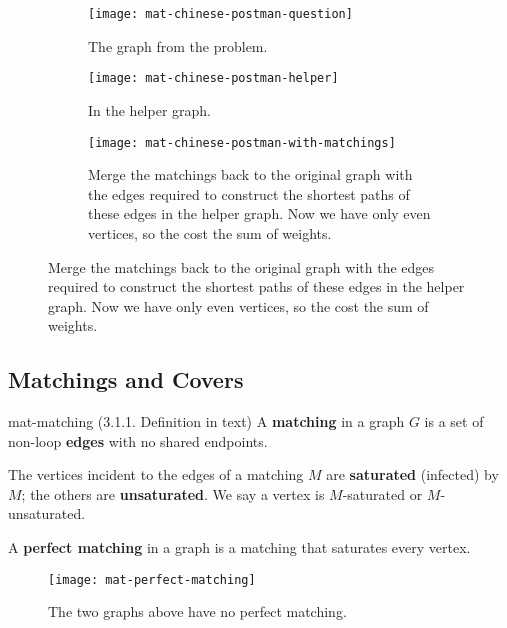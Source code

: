 \documentclass[../src/handouts/main.tex]{subfiles}
\begin{document}
\begin{figure}[htbp]
  \centering
  \begin{subfigure}[t]{.3\textwidth}
    \centering
    \texttt{[image: mat-chinese-postman-question]}
    \caption{The graph from the problem.}
    \label{fig:mat-chinese-postman-question}
  \end{subfigure}
  \hspace{.025\textwidth}
  \begin{subfigure}[t]{.3\textwidth}
    \centering
    \texttt{[image: mat-chinese-postman-helper]}
    \caption{In the helper graph.}
    \label{fig:mat-chinese-postman-helper}
  \end{subfigure}
  \hspace{.025\textwidth}
  \begin{subfigure}[t]{.3\textwidth}
    \centering
    \texttt{[image: mat-chinese-postman-with-matchings]}
    \caption{Merge the matchings back to the original graph with the edges required to construct the shortest paths of these edges in the helper graph. Now we have only even vertices, so the cost the sum of weights.}
    \label{fig:mat-chinese-postman-helper-with-matchings}
  \end{subfigure}
\end{figure}

\subsection{Matchings and Covers}

\begin{definition}{}{mat-matching}
  (3.1.1. Definition in text)
  A \textbf{matching} in a graph $G$ is a set of non-loop \textbf{edges} with no shared endpoints.

  The vertices incident to the edges of a matching $M$ are \textbf{saturated} (infected) by $M$; the others are \textbf{unsaturated}. We say a vertex is $M$-saturated or $M$-unsaturated.

  A \textbf{perfect matching} in a graph is a matching that saturates every vertex.
\end{definition}

\begin{figure}[htbp]
  \centering
  \texttt{[image: mat-perfect-matching]}
  \caption{The two graphs above have no perfect matching.}
  \label{fig:mat-perfect-matching}
\end{figure}
\end{document}
